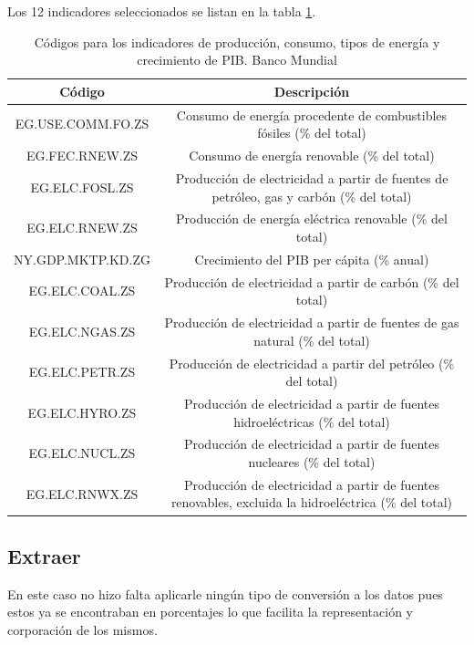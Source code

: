 \documentclass[spanish, letterpaper, 12 pt, conference]{ieeeconf}  %
\begin{document}
Los 12 indicadores seleccionados se listan en la tabla \ref{table_indicartors}.

\begin{table}[h]
\caption{Códigos para los indicadores de producción, consumo, tipos de energía y crecimiento de PIB. Banco Mundial}
\label{table_indicartors}
\begin{center}
\begin{tabular}{|c||c|}
\hline
Código & Descripción \\
\hline
EG.USE.COMM.FO.ZS   &  Consumo de energía procedente de combustibles fósiles (\% del total)\\
\hline
EG.FEC.RNEW.ZS  &  Consumo de energía renovable (\% del total)\\
\hline
EG.ELC.FOSL.ZS  &  Producción de electricidad a partir de fuentes de petróleo, gas y carbón (\% del total)\\
\hline
EG.ELC.RNEW.ZS  &  Producción de energía eléctrica renovable (\% del total)\\
\hline
NY.GDP.MKTP.KD.ZG & Crecimiento del PIB per cápita (\% anual)\\
\hline
EG.ELC.COAL.ZS & Producción de electricidad a partir de carbón  (\% del total)\\
\hline
EG.ELC.NGAS.ZS & Producción de electricidad a partir de fuentes de gas natural (\% del total)\\
\hline
EG.ELC.PETR.ZS & Producción de electricidad a partir del petróleo (\% del total)\\
\hline
EG.ELC.HYRO.ZS & Producción de electricidad a partir de fuentes hidroeléctricas (\% del total)\\
\hline
EG.ELC.NUCL.ZS & Producción de electricidad a partir de fuentes nucleares (\% del total)\\
\hline
EG.ELC.RNWX.ZS & Producción de electricidad a partir de fuentes renovables, excluida la hidroeléctrica (\% del total)\\
\hline
\end{tabular}
\end{center}
\end{table}


\subsection{Extraer}

En este caso no hizo falta aplicarle ningún tipo de conversión a los datos pues estos ya se encontraban en porcentajes lo que facilita la representación y corporación  de los mismos.
\end{document}
